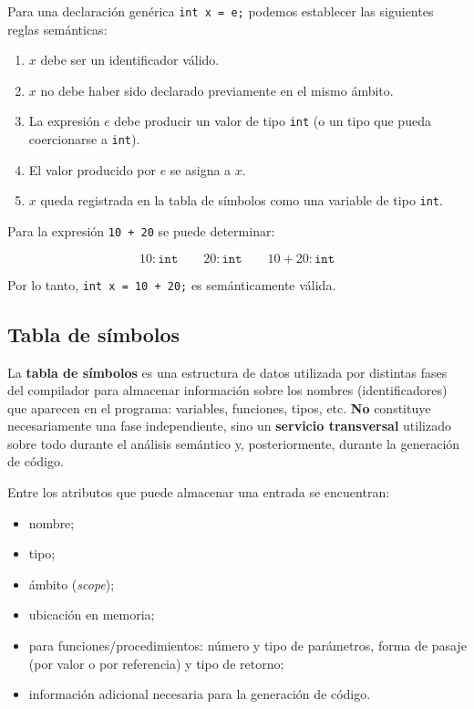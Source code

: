 \documentclass[11pt,a4paper]{article}
\begin{document}
Para una declaración genérica \texttt{int x = e;} podemos establecer las siguientes reglas
semánticas:

\begin{enumerate}
    \item $x$ debe ser un identificador válido.
    \item $x$ no debe haber sido declarado previamente en el mismo ámbito.
    \item La expresión $e$ debe producir un valor de tipo \texttt{int} (o un tipo que pueda
    coercionarse a \texttt{int}).
    \item El valor producido por $e$ se asigna a $x$.
    \item $x$ queda registrada en la tabla de símbolos como una variable de tipo \texttt{int}.
\end{enumerate}

Para la expresión \texttt{10 + 20} se puede determinar:

\[
10 : \texttt{int} \qquad 20 : \texttt{int} \qquad 10 + 20 : \texttt{int}
\]

Por lo tanto, \texttt{int x = 10 + 20;} es semánticamente válida.

\subsection{Tabla de símbolos}
\label{sec:tabla-simbolos}

La \textbf{tabla de símbolos} es una estructura de datos utilizada por distintas fases del
compilador para almacenar información sobre los nombres (identificadores) que aparecen en el
programa: variables, funciones, tipos, etc. \textbf{No} constituye necesariamente una fase
independiente, sino un \textbf{servicio transversal} utilizado sobre todo durante el análisis
semántico y, posteriormente, durante la generación de código.

Entre los atributos que puede almacenar una entrada se encuentran:

\begin{itemize}
    \item nombre;
    \item tipo;
    \item ámbito (\textit{scope});
    \item ubicación en memoria;
    \item para funciones/procedimientos: número y tipo de parámetros, forma de pasaje (por
    valor o por referencia) y tipo de retorno;
    \item información adicional necesaria para la generación de código.
\end{itemize}
\end{document}
